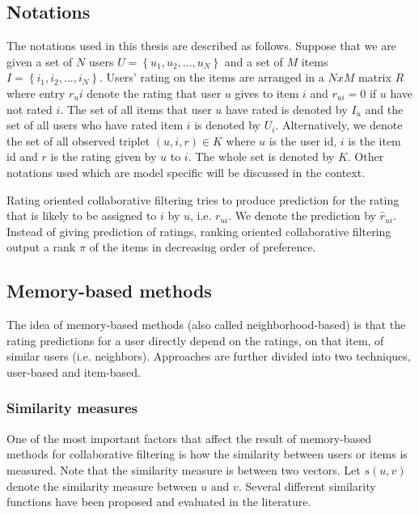 \documentclass[oneside,13pt]{extreport}
\begin{document}
\subsection{Notations}
The notations used in this thesis are described as follows. Suppose that we are given
a set of $N$ users $U = \left\{ {{u_1},{u_2},...,{u_N}} \right\}$ and a set of $M$ items $I = \left\{ {{i_1},{i_2},...,{i_N}} \right\}$. Users’ rating on the items are arranged in a $NxM$ matrix $R$ where entry $r_ui$ denote the rating that user $u$ gives to item
$i$ and $r_{ui} = 0$ if $u$ have not rated $i$. The set of all items that user $u$
have rated is denoted by $I_u$ and the set of all users who have rated item $i$ is denoted by $U_i$. Alternatively, we denote the set of all observed
triplet $\left( {u,i,r} \right) \in K$  where $u$ is the user id, $i$ is the item id
and $r$ is the rating given by $u$ to $i$. The whole set is denoted by $K$.
Other notations used which are model specific will be discussed in the context. 

Rating oriented collaborative filtering tries to produce prediction for the rating that is likely to be assigned to $i$ by $u$, i.e. $r_{ui}$. We denote the prediction by $\hat r_{ui}$. Instead of giving prediction of ratings, ranking oriented collaborative
filtering output a rank $\pi$ of the items in decreasing order
of preference.
\subsection{Memory-based methods}
The idea of memory-based methods (also called neighborhood-based) is that the rating predictions for a user directly depend on the ratings, on that item, of similar users (i.e. neighbors).  Approaches are further divided into two techniques, user-based and item-based.

\subsubsection{Similarity measures}
One of the most important factors that affect the result of memory-based methods for collaborative filtering is how the similarity between
users or items is measured. Note that the similarity measure is between two vectors. Let $s(u,v)$ denote the similarity measure between $u$ and $v$. Several different similarity functions have been proposed and evaluated in the literature.
\end{document}
